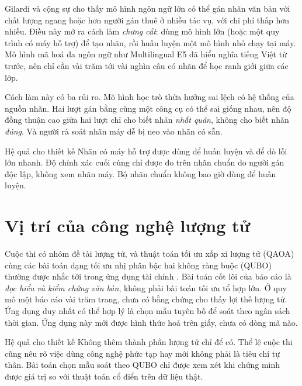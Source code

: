 Gilardi và cộng sự \cite{gilardi2023} cho thấy mô hình ngôn ngữ lớn có thể gán nhãn văn bản với chất lượng ngang hoặc hơn người gán thuê ở nhiều tác vụ, với chi phí thấp hơn nhiều. Điều này mở ra cách làm \emph{chưng cất}: dùng mô hình lớn (hoặc một quy trình có máy hỗ trợ) để tạo nhãn, rồi huấn luyện một mô hình nhỏ chạy tại máy. Mô hình mã hoá đa ngôn ngữ như Multilingual E5 \cite{wang2024e5} đã hiểu nghĩa tiếng Việt từ trước, nên chỉ cần vài trăm tới vài nghìn câu có nhãn để học ranh giới giữa các lớp.

Cách làm này có ba rủi ro. Mô hình học trò thừa hưởng sai lệch có hệ thống của nguồn nhãn. Hai lượt gán bằng cùng một công cụ có thể sai giống nhau, nên độ đồng thuận cao giữa hai lượt chỉ cho biết nhãn \emph{nhất quán}, không cho biết nhãn \emph{đúng}. Và người rà soát nhãn máy dễ bị neo vào nhãn có sẵn.

\begin{hopy}{Hệ quả cho thiết kế}
Nhãn có máy hỗ trợ được dùng để huấn luyện và để dò lỗi lớn nhanh. Độ chính xác cuối cùng chỉ được đo trên nhãn chuẩn do người gán độc lập, không xem nhãn máy. Bộ nhãn chuẩn không bao giờ dùng để huấn luyện.
\end{hopy}

\section{Vị trí của công nghệ lượng tử}\label{sec:luong-tu}

Cuộc thi có nhóm đề tài lượng tử, và thuật toán tối ưu xấp xỉ lượng tử (QAOA) \cite{farhi2014} cùng các bài toán dạng tối ưu nhị phân bậc hai không ràng buộc (QUBO) thường được nhắc tới trong ứng dụng tài chính \cite{herman2023}. Bài toán cốt lõi của báo cáo là \emph{đọc hiểu và kiểm chứng văn bản}, không phải bài toán tối ưu tổ hợp lớn. Ở quy mô một báo cáo vài trăm trang, chưa có bằng chứng cho thấy lợi thế lượng tử. Ứng dụng duy nhất có thể hợp lý là chọn mẫu tuyên bố để soát theo ngân sách thời gian. Ứng dụng này mới được hình thức hoá trên giấy, chưa có dòng mã nào.

\begin{hopy}{Hệ quả cho thiết kế}
Không thêm thành phần lượng tử chỉ để có. Thể lệ cuộc thi cũng nêu rõ việc dùng công nghệ phức tạp hay mới không phải là tiêu chí tự thân. Bài toán chọn mẫu soát theo QUBO chỉ được xem xét khi chứng minh được giá trị so với thuật toán cổ điển trên dữ liệu thật.
\end{hopy}


